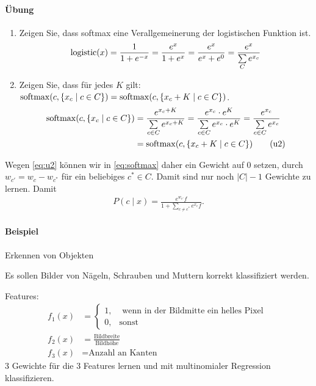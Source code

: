 \begin{shaded}
\paragraph{Übung}
\label{par:ubungsm}
\begin{enumerate}
    \item Zeigen Sie, dass softmax eine Verallgemeinerung der logistischen
        Funktion ist.
    \begin{align*}
        \operatorname*{logistic}(x)=\frac{1}{1+e^{-x}}=\frac{e^x}{1+e^x}=\frac{e^x}{e^x+e^0}=\frac{e^x}{\sum\limits_C
        e^{x_c}}
    \end{align*}
    \item Zeigen Sie, dass für jedes $K$ gilt: $\operatorname*{softmax}(c,\{x_c\mid c\in
        C\})=\operatorname*{softmax}(c,\{x_c+K\mid c\in C\})$.
        \begin{align*}
            \operatorname*{softmax}(c,\{x_c\mid c\in C\}) &= \frac{e^{x_c+K}}{\sum\limits_{c\in
                    C}e^{x_c+K}} = \frac{e^{x_c}\cdot e^K}{\sum\limits_{c\in
                    C}e^{x_c}\cdot e^K}=\frac{e^{x_c}}{\sum\limits_{c\in
                    C}e^{x_c}}\\ 
            &= \operatorname*{softmax}(c,\{x_c+K\mid c\in C\}) \tag{u2}\label{eq:u2}
        \end{align*}
\end{enumerate}
\end{shaded}
Wegen \cref{eq:u2} können wir in \cref{eq:softmax} daher ein Gewicht auf 0 setzen, durch \(w_{c'} = w_c-w_{c^*}\) für ein beliebiges $c^*\in C$.
Damit sind nur noch \(|C|-1\) Gewichte zu lernen.
Damit
\begin{align*}
    P(c\mid x)=\frac{e^{w_{c'}}f}{1+\sum\limits_{c\neq c^*}e^{x_c}f}.
\end{align*}

\begin{shaded}
\paragraph{Beispiel}
\label{par:beispielsw}
Erkennen von Objekten

Es sollen Bilder von Nägeln, Schrauben und Muttern korrekt klassifiziert werden.

Features:
\begin{align*}
    f_1(x)&=\begin{cases}1, & \text{ wenn in der Bildmitte ein helles Pixel }\\
        0, & \text{sonst} \end{cases}\\
    f_2(x)&=\frac{\text{Bildbreite}}{\text{Bildhöhe}}\\
    f_3(x)&=\text{Anzahl an Kanten}
\end{align*}
3 Gewichte für die 3 Features lernen und mit multinomialer Regression
klassifizieren.
\end{shaded}

